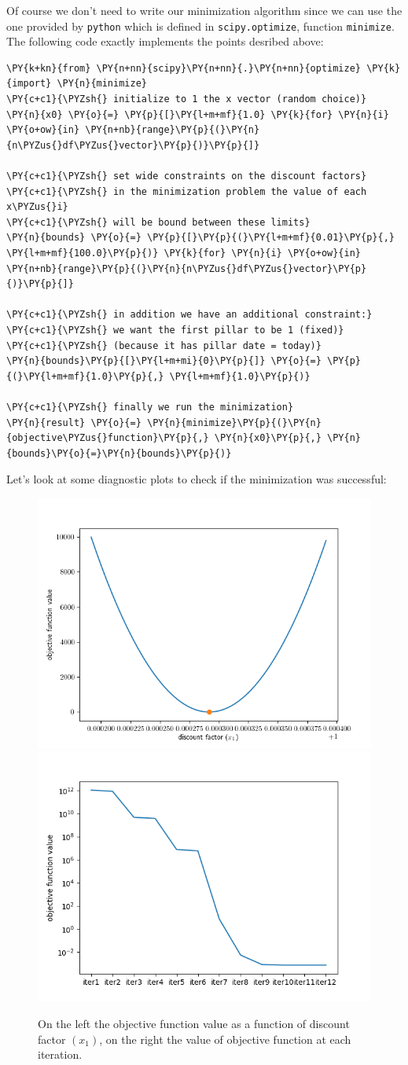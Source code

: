 Of course we don't need to write our minimization algorithm since we can use the one provided by \texttt{python} which is defined in \texttt{scipy.optimize}, function \texttt{minimize}.
The following code exactly implements the points desribed above:

\begin{Verbatim}[commandchars=\\\{\}]
\PY{k+kn}{from} \PY{n+nn}{scipy}\PY{n+nn}{.}\PY{n+nn}{optimize} \PY{k}{import} \PY{n}{minimize}   
\PY{c+c1}{\PYZsh{} initialize to 1 the x vector (random choice)}
\PY{n}{x0} \PY{o}{=} \PY{p}{[}\PY{l+m+mf}{1.0} \PY{k}{for} \PY{n}{i} \PY{o+ow}{in} \PY{n+nb}{range}\PY{p}{(}\PY{n}{n\PYZus{}df\PYZus{}vector}\PY{p}{)}\PY{p}{]} 

\PY{c+c1}{\PYZsh{} set wide constraints on the discount factors}
\PY{c+c1}{\PYZsh{} in the minimization problem the value of each x\PYZus{}i}
\PY{c+c1}{\PYZsh{} will be bound between these limits}
\PY{n}{bounds} \PY{o}{=} \PY{p}{[}\PY{p}{(}\PY{l+m+mf}{0.01}\PY{p}{,} \PY{l+m+mf}{100.0}\PY{p}{)} \PY{k}{for} \PY{n}{i} \PY{o+ow}{in} \PY{n+nb}{range}\PY{p}{(}\PY{n}{n\PYZus{}df\PYZus{}vector}\PY{p}{)}\PY{p}{]} 

\PY{c+c1}{\PYZsh{} in addition we have an additional constraint:}
\PY{c+c1}{\PYZsh{} we want the first pillar to be 1 (fixed)}
\PY{c+c1}{\PYZsh{} (because it has pillar date = today)}
\PY{n}{bounds}\PY{p}{[}\PY{l+m+mi}{0}\PY{p}{]} \PY{o}{=} \PY{p}{(}\PY{l+m+mf}{1.0}\PY{p}{,} \PY{l+m+mf}{1.0}\PY{p}{)}

\PY{c+c1}{\PYZsh{} finally we run the minimization}
\PY{n}{result} \PY{o}{=} \PY{n}{minimize}\PY{p}{(}\PY{n}{objective\PYZus{}function}\PY{p}{,} \PY{n}{x0}\PY{p}{,} \PY{n}{bounds}\PY{o}{=}\PY{n}{bounds}\PY{p}{)}
\end{Verbatim}

Let's look at some diagnostic plots to check if the minimization was successful:

\begin{figure}[h]
  \centering
  \includegraphics[width=0.45\linewidth]{obj_func.png}
  \includegraphics[width=0.45\linewidth]{obj_func_iter.png}
  \caption{On the left the objective function value as a function of discount factor $(x_1)$,
  on the right the value of objective function at each iteration.}
\end{figure}

